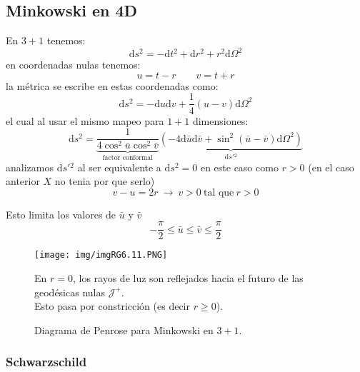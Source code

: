 \documentclass[../main]{subfiles}
\begin{document}
\subsection{Minkowski en 4D}

En $3+1$ tenemos:
\begin{equation}
    \mathrm{d}s^2=-\mathrm{d}t^2+\mathrm{d}r^2+r^2\mathrm{d}\Omega^2
\end{equation}
en coordenadas nulas tenemos:
\begin{equation}
    u=t-r\qquad v=t+r
\end{equation}
la métrica se escribe en estas coordenadas como:
\begin{equation}
    \mathrm{d}s^2=-\mathrm{d}u\mathrm{d}v+\dfrac{1}{4}(u-v)\mathrm{d}\Omega^2
\end{equation}
el cual al usar el mismo mapeo para $1+1$ dimensiones:
\begin{equation}
    \mathrm{d}s^2=\underbrace{\dfrac{1}{4\cos^2 \bar{u} \cos^2 \bar{v}}}_{\text{factor conformal}} \underbrace{(-4\mathrm{d}\bar{u}\mathrm{d}\bar{v}+\sin^2(\bar{u}-\bar{v})\mathrm{d}\Omega^2)}_{\mathrm{d}s'{}^2}
\end{equation}
analizamos $\mathrm{d}s'{}^2$ al ser equivalente a $\mathrm{d}s^2=0$ en este caso como $r>0$ (en el caso anterior $X$ no tenia por que serlo)
\begin{equation}
    v-u=2r \ \rightarrow \ v>0 \ \text{tal que} \ r>0
\end{equation}

Esto limita los valores de $\bar{u}$ y $\bar{v}$
\begin{equation}
    -\dfrac{\pi}{2}\leq \bar{u} \leq \bar{v} \leq \dfrac{\pi}{2}
\end{equation}
\begin{figure}[h]
    \begin{minipage}{0.6\textwidth}
        \centering
            \texttt{[image: img/imgRG6.11.PNG]}
            \caption{Diagrama de Penrose para Minkowski en $3+1$.}
    \end{minipage}
    \begin{minipage}{0.4\textwidth}
        En $r=0$, los rayos de luz son reflejados hacia el futuro de las geodésicas nulas $\mathcal{J}^+$.
        \\
        Esto pasa por constricción (es decir $r\geq 0$).
    \end{minipage}
\end{figure}

\subsubsection{Schwarzschild}
\end{document}
